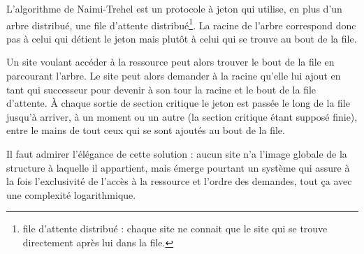 L'algorithme de Naimi-Trehel est un protocole à jeton qui utilise, en plus d'un arbre distribué, une file d'attente distribué\footnote{file d'attente distribué : chaque site ne connait que le site qui se trouve directement après lui dans la file.}. La racine de l'arbre correspond donc pas à celui qui détient le jeton mais plutôt à celui qui se trouve au bout de la file.

Un site voulant accéder à la ressource peut alors trouver le bout de la file en parcourant l'arbre. Le site peut alors demander à la racine qu'elle lui ajout en tant qui successeur pour devenir à son tour la racine et le bout de la file d'attente. À chaque sortie de section critique le jeton est passée le long de la file jusqu'à arriver, à un moment ou un autre (la section critique étant supposé finie), entre le mains de tout ceux qui se sont ajoutés au bout de la file.

Il faut admirer l'élégance de cette solution : aucun site n'a l'image globale de la structure à laquelle il appartient, mais émerge pourtant un système qui assure à la fois l'exclusivité de l'accès à la ressource et l'ordre des demandes, tout ça avec une complexité logarithmique.